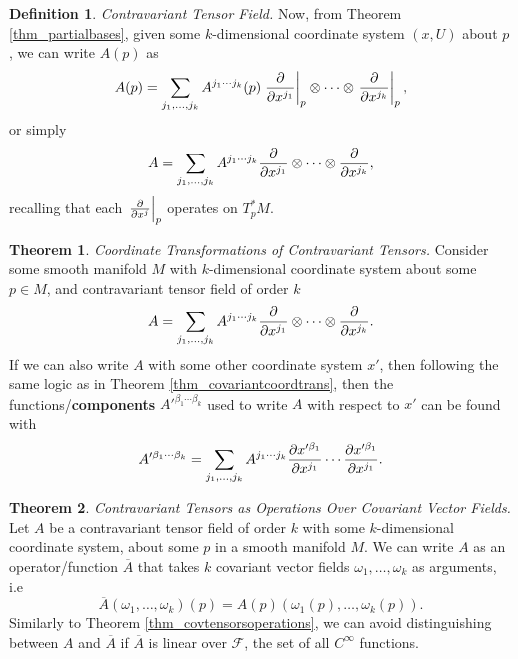 \documentclass[10pt,landscape]{article}
\theoremstyle{definition}
\newtheorem{definition}{Definition}[section]
\theoremstyle{theorem}
\newtheorem{theorem}{Theorem}[section]
\theoremstyle{summary}
\theoremstyle{remark}
\newcommand{\Ci}{C^\infty}
\begin{document}
\begin{multicols*}{3}
\begin{definition}{\textit{Contravariant Tensor Field.}}
    Now, from Theorem \ref{thm_partialbases}, given some $k$-dimensional coordinate system $(x, U)$ about $p$, we can write $A(p)$ as
    \begin{equation}
        A(p) = \sum\limits_{j_1,\ldots,j_k}A^{j_1\cdots j_k}(p)\left.\pdv{}{x^{j_1}}\right|_p\otimes\cdots\otimes\left.\pdv{}{x^{j_k}}\right|_p,
    \end{equation}
    or simply
    \begin{equation}
        A = \sum\limits_{j_1,\ldots,j_k}A^{j_1\cdots j_k}\pdv{}{x^{j_1}}\otimes\cdots\otimes\pdv{}{x^{j_k}},
    \end{equation}
    recalling that each $\left.\pdv{}{x^{j}}\right|_p$ operates on $T_p^*M$.
\end{definition}

\theoremstyle{theorem}
\begin{theorem}{\textit{Coordinate Transformations of Contravariant Tensors.}}
    \label{thm_contravariantcoordtrans}
    Consider some smooth manifold $M$ with $k$-dimensional coordinate system about some $p\in M$, and contravariant tensor field of order $k$
    \begin{equation}
        A = \sum\limits_{j_1,\ldots,j_k}A^{j_1\cdots j_k}\pdv{}{x^{j_1}}\otimes\cdots\otimes\pdv{}{x^{j_k}}.
    \end{equation}
    If we can also write $A$ with some other coordinate system $x'$, then following the same logic as in Theorem \ref{thm_covariantcoordtrans}, then the functions/\textbf{components} $A'^{\beta_1\cdots\beta_k}$ used to write $A$ with respect to $x'$ can be found with
    \begin{equation}
        A'^{\beta_1\cdots\beta_k} = \sum\limits_{j_1,\ldots,j_k}A^{j_1\cdots j_k}\pdv{x'^{\beta_1}}{x^{j_1}}\cdots\pdv{x'^{\beta_1}}{x^{j_1}}.
    \end{equation}

\end{theorem}

\theoremstyle{theorem}
\begin{theorem}{\textit{Contravariant Tensors as Operations Over Covariant Vector Fields.}}
    Let $A$ be a contravariant tensor field of order $k$ with some $k$-dimensional coordinate system, about some $p$ in a smooth manifold $M$. We can write $A$ as an operator/function $\overline{A}$ that takes $k$ covariant vector fields $\omega_1,\ldots,\omega_k$ as arguments, i.e
    \begin{equation}
        \overline{A}(\omega_1,\ldots,\omega_k)(p) = A(p)(\omega_1(p),\ldots,\omega_k(p)).
    \end{equation}
    Similarly to Theorem \ref{thm_covtensorsoperations}, we can avoid distinguishing between $A$ and $\overline{A}$ if $\overline{A}$ is linear over $\mathcal{F}$, the set of all $\Ci$ functions.
\end{theorem}


\end{multicols*}
\end{document}
